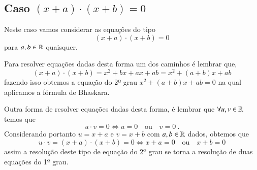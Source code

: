 \subsection{Caso \texorpdfstring{$(x+a)\cdot (x+b)= 0$}{(x+a)(x+b) = 0}}
 Neste caso vamos considerar as equações do tipo
\[(x+a)\cdot (x+b)= 0\]
para $a, b \in \mathbb{R}$ quaisquer.

Para resolver equações dadas desta forma um dos caminhos é lembrar que,
\[(x+a)\cdot (x+b)= x^2 + bx + ax + ab= x^2 + (a + b)x + ab\]
fazendo isso obtemos a equação do 2º grau $x^2 + (a + b)x + ab= 0$ na qual aplicamos a fórmula de Bhaskara.

Outra forma de resolver equações dadas desta forma, é lembrar que $\forall u, v \in \mathbb{R}$ temos que
\[u \cdot v= 0 \Leftrightarrow u= 0 \ \ \ \text{ ou } \ \ \ v=0 \ .\]
Considerando portanto $u= x+a$ e $v= x+b$ com $a, b \in \mathbb{R}$ dados, obtemos que
\[u \cdot v= (x+a)\cdot (x+b)= 0 \Leftrightarrow x+a= 0 \ \ \ \text{ ou } \ \ \ x+b=0\]
assim a resolução deste tipo de equação do 2º grau se torna a resolução de duas equações do 1º grau.

